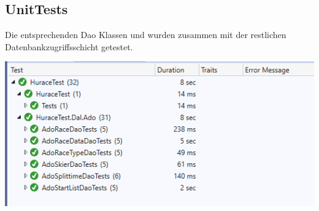 \documentclass[a4paper, 12pt]{article}
\begin{document}
	\subsection{UnitTests}
	Die entsprechenden Dao Klassen und wurden zusammen mit der restlichen Datenbankzugriffsschicht getestet. 
	\newline
	\newline
	
	\includegraphics[width=.7\textwidth]{img/UnitTests.png}

	\newpage	
\end{document}
